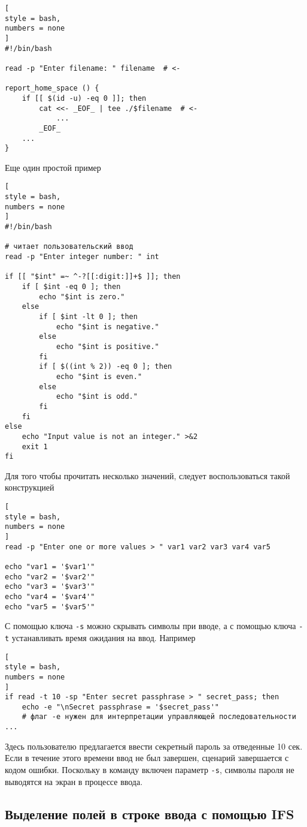 \documentclass[%
	11pt,
	a4paper,
	utf8,
		]{article}
\begin{document}
\begin{lstlisting}[
style = bash,
numbers = none
]
#!/bin/bash

read -p "Enter filename: " filename  # <-

report_home_space () {
    if [[ $(id -u) -eq 0 ]]; then
        cat <<- _EOF_ | tee ./$filename  # <-
            ...
        _EOF_
    ...
}
\end{lstlisting}

Еще один простой пример
\begin{lstlisting}[
style = bash,
numbers = none
]
#!/bin/bash

# читает пользовательский ввод
read -p "Enter integer number: " int

if [[ "$int" =~ ^-?[[:digit:]]+$ ]]; then
    if [ $int -eq 0 ]; then
        echo "$int is zero."
    else
        if [ $int -lt 0 ]; then 
            echo "$int is negative."
        else
            echo "$int is positive."
        fi
        if [ $((int % 2)) -eq 0 ]; then
            echo "$int is even."
        else
            echo "$int is odd."
        fi
    fi
else
    echo "Input value is not an integer." >&2
    exit 1
fi
\end{lstlisting}

Для того чтобы прочитать несколько значений, следует воспользоваться такой конструкцией
\begin{lstlisting}[
style = bash,
numbers = none
]
read -p "Enter one or more values > " var1 var2 var3 var4 var5

echo "var1 = '$var1'"
echo "var2 = '$var2'"
echo "var3 = '$var3'"
echo "var4 = '$var4'"
echo "var5 = '$var5'"
\end{lstlisting}

С помощью ключа \verb|-s| можно скрывать символы при вводе, а с помощью ключа \verb|-t| устанавливать время ожидания на ввод. Например
\begin{lstlisting}[
style = bash,
numbers = none
]
if read -t 10 -sp "Enter secret passphrase > " secret_pass; then
    echo -e "\nSecret passphrase = '$secret_pass'" 
    # флаг -e нужен для интерпретации управляющей последовательности
...
\end{lstlisting}

Здесь пользователю предлагается ввести секретный пароль за отведенные 10 сек. Если в течение этого времени ввод не был завершен, сценарий завершается с кодом ошибки. Поскольку в команду включен параметр \verb|-s|, символы пароля не выводятся на экран в процессе ввода.

\subsection{Выделение полей в строке ввода с помощью IFS}
\end{document}
